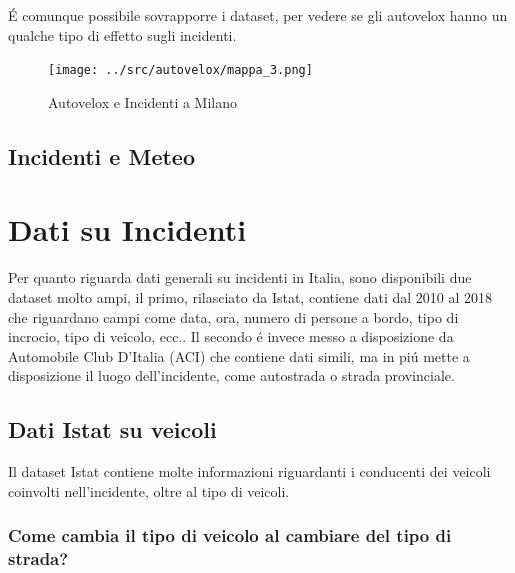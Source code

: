 \documentclass[a4paper]{report}
\begin{document}
\'E comunque possibile sovrapporre i dataset, per vedere se gli autovelox hanno un qualche tipo di 
effetto sugli incidenti.

\begin{figure}[!ht]
    \texttt{[image: ../src/autovelox/mappa\_3.png]}
    \caption{Autovelox e Incidenti a Milano}
    \label{fig:autovelox}
\end{figure}



\newpage
\section{Incidenti e Meteo}

\newpage
\chapter{Dati su Incidenti}

Per quanto riguarda dati generali su incidenti in Italia, sono disponibili due dataset molto ampi, 
il primo, rilasciato da Istat, contiene dati dal 2010 al 2018 che riguardano campi come data, ora, 
numero di persone a bordo, tipo di incrocio, tipo di veicolo, ecc..
Il secondo \'e invece messo a disposizione da Automobile Club D'Italia (ACI) che contiene dati simili, 
ma in pi\'u mette a disposizione il luogo dell'incidente, come autostrada o strada provinciale.

\newpage
\section{Dati Istat su veicoli}

Il dataset Istat contiene molte informazioni riguardanti i conducenti dei veicoli coinvolti 
nell'incidente, oltre al tipo di veicoli.

\newpage
\subsection{Come cambia il tipo di veicolo al cambiare del tipo di strada?}
\end{document}

